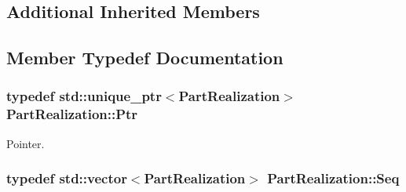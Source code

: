 \subsection*{Additional Inherited Members}


\subsection{Member Typedef Documentation}
\hypertarget{class_part_realization_aec2d1af3a61dba0792d0d95bf32e7118}{
\subsubsection[{Ptr}]{\setlength{\rightskip}{0pt plus 5cm}typedef std\-::unique\-\_\-ptr$<${\bf Part\-Realization}$>$ {\bf Part\-Realization\-::\-Ptr}}}\label{class_part_realization_aec2d1af3a61dba0792d0d95bf32e7118}


Pointer. 

\hypertarget{class_part_realization_ac53d0830ece33a44aaf825f109e00f59}{
\subsubsection[{Seq}]{\setlength{\rightskip}{0pt plus 5cm}typedef std\-::vector$<${\bf Part\-Realization}$>$ {\bf Part\-Realization\-::\-Seq}}}\label{class_part_realization_ac53d0830ece33a44aaf825f109e00f59}


